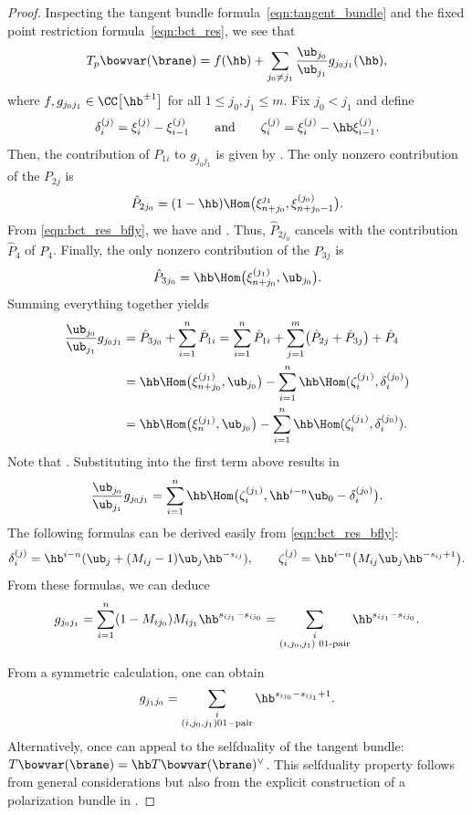 \begin{proof}
Inspecting the tangent bundle formula~\eqref{eqn:tangent_bundle} and the fixed point restriction formula~\eqref{eqn:bct_res}, we see that
\[
T_p\bowvar(\brane) = f(\hb) + \sum_{j_0 \neq j_1} \frac{\ub_{j_0}}{\ub_{j_1}} g_{j_0j_1}(\hb),
\]
where $f, g_{j_0j_1} \in \CC\big[\hb^{\pm 1}\big]$ for all $1\leq j_0, j_1 \leq m$. Fix $j_0 < j_1$ and define
\[
\delta_i^{(j)} = \xi_i^{(j)} - \xi_{i-1}^{(j)} \qquad \text{and} \qquad
\zeta_i^{(j)} = \xi_i^{(j)} - \hb\xi_{i-1}^{(j)}.
\] Then, the contribution of $P_{1i}$ to $g_{j_0j_1}$ is given by .
The only nonzero contribution of the $P_{2j}$ is
\[
\hat{P}_{2j_0} = (1-\hb)\Hom\bigl(\xi_{n+j_0}^{j_1}, \xi_{n+j_0 - 1}^{(j_0)}\bigr).
\]
 From \eqref{eqn:bct_res_bfly}, we have  and . Thus, $\hat{P}_{2j_0}$ cancels with the contribution~$\hat{P}_4$ of $P_4$. Finally, the only nonzero contribution of the $P_{3j}$ is
 \[
 \hat{P}_{3j_0} = \hb\Hom\bigl(\xi_{n+j_0}^{(j_1)}, \ub_{j_0}\bigr).
 \] Summing everything together yields
\begin{align*}
\frac{\ub_{j_0}}{\ub_{j_1}}g_{j_0j_1} &= \hat{P}_{3j_0} + \sum_{i=1}^n \hat{P}_{1i}
= \sum_{i=1}^n \hat{P}_{1i} + \sum_{j=1}^m \bigl( \hat{P}_{2j} + \hat{P}_{3j} \bigr) + \hat{P}_4 \\
&= \hb\Hom\bigl(\xi_{n+j_0}^{(j_1)}, \ub_{j_0}\bigr) - \sum_{i=1}^n \hb\Hom(\zeta_i^{(j_1)}, \delta_i^{(j_0)}) \\
&= \hb\Hom\bigl(\xi_n^{(j_1)}, \ub_{j_0}\bigr) -\sum_{i=1}^n \hb\Hom(\zeta_i^{(j_1)}, \delta_i^{(j_0)}).
\end{align*}
Note that . Substituting into the first term above results in
\[
\frac{\ub_{j_0}}{\ub_{j_1}}g_{j_0j_1} = \sum_{i=1}^n\hb\Hom\bigl(\zeta_i^{(j_1)}, \hb^{i-n}\ub_0 - \delta_i^{(j_0)}\bigr).
\]
The following formulas can be derived easily from \eqref{eqn:bct_res_bfly}:
\[
\delta_i^{(j)} = \hb^{i-n}(\ub_j + (M_{ij} - 1)\ub_j\hb^{-s_{ij}}),\qquad \zeta_i^{(j)} = \hb^{i-n} \bigl(M_{ij}\ub_j\hb^{-s_{ij}+1}\bigr).
\]
From these formulas, we can deduce
\[
g_{j_0j_1} = \sum_{i=1}^n (1-M_{ij_0})M_{ij_1}\hb^{s_{ij_1}-s_{ij_0}} = \sum_{\substack{i \\ (i, j_0, j_1) \text{ 01-pair}}} \hb^{s_{ij_1}-s_{ij_0}}.
\]

From a symmetric calculation, one can obtain
\[
g_{j_1j_0} = \sum_{\substack{i \\ (i, j_0, j_1) \mathrm{01-pair}}} \hb^{s_{ij_0}-s_{ij_1}+1}.
\]
Alternatively, once can appeal to the selfduality of the tangent bundle: $T\bowvar(\brane) = \hb T\bowvar(\brane)^\vee$. This selfduality property follows from general considerations but also from the explicit construction of a polarization bundle in \cite[Section~4.4.2]{S}.


\end{proof}
